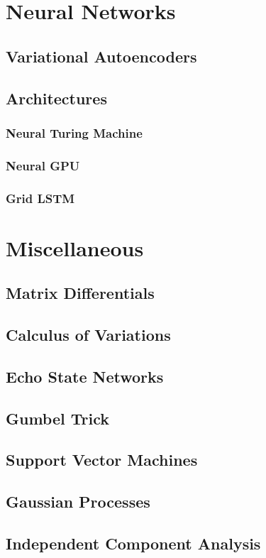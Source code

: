 \documentclass[12pt]{article}
\begin{document}
\section{Neural Networks}

\subsection{Variational Autoencoders}

\subsection{Architectures}

\subsubsection{Neural Turing Machine}

\subsubsection{Neural GPU}

\subsubsection{Grid LSTM}

\section{Miscellaneous}

\subsection{Matrix Differentials}

\subsection{Calculus of Variations}

\subsection{Echo State Networks}

\subsection{Gumbel Trick}

\subsection{Support Vector Machines}

\subsection{Gaussian Processes}

\subsection{Independent Component Analysis}
\end{document}
